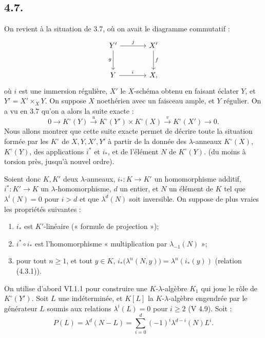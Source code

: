 \subsection*{4.7.}

On
revient à la situation de 3.7, où on avait le diagramme commutatif :
\[
\begin{tikzcd}[column sep=large,row sep=large]
Y' \arrow[r,"j"] \arrow[d,"g"'] & X' \arrow[d,"f"]\\
Y \arrow[r,"i"] & X,
\end{tikzcd}
\]
où \(i\) est une immersion régulière, \(X'\) le \(X\)-schéma obtenu en faisant éclater \(Y\), et \(Y'=X'\times_XY\). On suppose \(X\) noethérien avec un faisceau ample, et \(Y\) régulier. On a vu en 3.7 qu'on a alors la suite exacte :
\[
0\longrightarrow K^\circ(Y)\xrightarrow{u}
K^\circ(Y')\times K^\circ(X)\xrightarrow{v}
K^\circ(X')\longrightarrow0.
\]
Nous allons montrer que cette suite exacte permet de décrire toute la situation formée par les \(K^\circ\) de \(X,Y,X',Y'\) à partir de la donnée des \(\lambda\)-anneaux \(K^\circ(X)\), \(K^\circ(Y)\), des applications \(i^*\) et \(i_*\), et de l'élément \(N\) de \(K^\circ(Y)\). (du moins à torsion près, jusqu'à nouvel ordre).

Soient donc \(K,K'\) deux \(\lambda\)-anneaux, \(i_*:K\to K'\) un homomorphisme additif, \(i^*:K'\to K\) un \(\lambda\)-homomorphisme, \(d\) un entier, et \(N\) un élément de \(K\) tel que \(\lambda^i(N)=0\) pour \(i>d\) et que \(\lambda^d(N)\) soit inversible. On suppose de plus vraies les propriétés suivantes :
\begin{enumerate}[label=\roman*)]
\item \(i_*\) est \(K'\)-linéaire (« formule de projection »);
\item \(i^*\circ i_*\) est l'homomorphisme « multiplication par \(\lambda_{-1}(N)\) »;
\item pour tout \(n\ge1\), et tout \(y\in K\), \(i_*\bigl(\lambda^n(N,y)\bigr)=\lambda^n(i_*(y))\) (relation (4.3.1)).
\end{enumerate}

On utilise d'abord VI.1.1 pour construire une \(K\)-\(\lambda\)-algèbre \(K_1\) qui joue le rôle de \(K^\circ(Y')\). Soit \(L\) une indéterminée, et \(K[L]\) la \(K\)-\(\lambda\)-algèbre engendrée par le générateur \(L\) soumis aux relations \(\lambda^i(L)=0\) pour \(i\ge2\) (V 4.9). Soit :
\[
  P(L)=\lambda^d(N-L)=\sum_{i=0}^{d}(-1)^i\lambda^{d-i}(N)L^i.
\]
